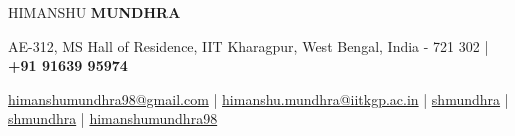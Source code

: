 \documentclass[10pt]{article}
\begin{document}
\begin{center}
    {\Huge HIMANSHU \textbf{MUNDHRA}}\\[0.7ex]
\end{center}
\vspace{-3.5ex}
\begin{center}
    {\small AE-312, MS Hall of Residence, IIT Kharagpur, West Bengal, India - 721 302 | \faMobile\hspace{0.2ex} \textbf{+91 91639 95974} }
\end{center}
\vspace{-3.8ex}
\begin{center}
    \Letter\hspace{0.2ex}
    \href{mailto:himanshumundhra98@gmail.com}{\small himanshumundhra98@gmail.com} |
    \Letter\hspace{0.2ex}
    \href{mailto:himanshu.mundhra@iitkgp.ac.in}{\small himanshu.mundhra@iitkgp.ac.in} | 
    \faLinkedinSquare\hspace{0.2ex}
    \href{https://www.linkedin.com/in/shmundhra/}{\small shmundhra} | 
    \faGithub\hspace{0.2ex}
    \href{https://github.com/shmundhra/}{\small shmundhra} | 
    \faMedium\hspace{0.2ex}
    \href{https://medium.com/@himanshumundhra98}{\small himanshumundhra98}
\end{center}
\end{document}
